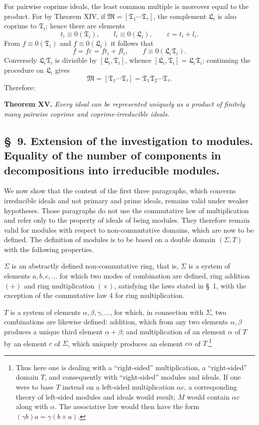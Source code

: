 \documentclass[11pt]{article}
\newcommand{\ideal}[1]{\mathfrak{#1}}
\begin{document}
For pairwise coprime ideals, the least common multiple is moreover equal to the product. For by Theorem XIV, if $\ideal M=[\ideal T_1\cdots\ideal T_\tau]$, the complement $\ideal L_i$ is also coprime to $\ideal T_i$; hence there are elements
\[
 t_i\equiv0(\ideal T_i),
 \qquad
 l_i\equiv0(\ideal L_i),
 \qquad
 \varepsilon=t_i+l_i.
\]
From $f\equiv0(\ideal T_i)$ and $f\equiv0(\ideal L_i)$ it follows that
\[
 f=f\varepsilon=ft_i+fl_i,
 \qquad
 f\equiv0(\ideal L_i\ideal T_i).
\]
Conversely $\ideal L_i\ideal T_i$ is divisible by $[\ideal L_i,
\ideal T_i]$, whence $[\ideal L_i,
\ideal T_i]=\ideal L_i\ideal T_i$; continuing the procedure on $\ideal L_i$ gives
\[
 \ideal M=[\ideal T_1\cdots\ideal T_\tau]
       =\ideal T_1\ideal T_2\cdots\ideal T_\tau.
\]
Therefore:

\textbf{Theorem XV.} \emph{Every ideal can be represented uniquely as a product of finitely many pairwise coprime and coprime-irreducible ideals.}


\providecommand{\eqzero}[1]{\equiv 0\,(#1)}
\providecommand{\ideal}[1]{\mathfrak{#1}}
\setcounter{footnote}{34}

\subsection*{\S~9. Extension of the investigation to modules. Equality of the number of components in decompositions into irreducible modules.}

We now show that the content of the first three paragraphs, which concerns irreducible ideals and not primary and prime ideals, remains valid under weaker hypotheses. Those paragraphs do not use the commutative law of multiplication and refer only to the property of ideals of being modules. They therefore remain valid for modules with respect to non-commutative domains, which are now to be defined. The definition of modules is to be based on a double domain $(\Sigma,T)$ with the following properties.

$\Sigma$ is an abstractly defined non-commutative ring, that is, $\Sigma$ is a system of elements $a,b,c,\ldots$ for which two modes of combination are defined, ring addition $(+)$ and ring multiplication $(\times)$, satisfying the laws stated in \S~1, with the exception of the commutative law 4 for ring multiplication.

$T$ is a system of elements $\alpha,\beta,\gamma,\ldots$, for which, in connection with $\Sigma$, two combinations are likewise defined: addition, which from any two elements $\alpha,\beta$ produces a unique third element $\alpha+\beta$; and multiplication of an element $\alpha$ of $T$ by an element $c$ of $\Sigma$, which uniquely produces an element $c\alpha$ of $T$.\footnote{Thus here one is dealing with a ``right-sided'' multiplication, a ``right-sided'' domain $T$, and consequently with ``right-sided'' modules and ideals. If one were to base $T$ instead on a left-sided multiplication $\alpha c$, a corresponding theory of left-sided modules and ideals would result; $M$ would contain $\alpha c$ along with $\alpha$. The associative law would then have the form $(\gamma b)a=\gamma(b\times a)$.}
\end{document}
